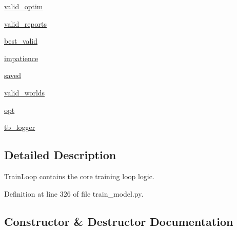 \begin{DoxyCompactItemize}
\hyperlink{classparlai_1_1scripts_1_1train__model_1_1TrainLoop_abe8e421aafd3a42103c794f3e3a1bcc6}{valid\+\_\+optim}
\item 
\hyperlink{classparlai_1_1scripts_1_1train__model_1_1TrainLoop_abceaa403716b5def408e2fedca6c651d}{valid\+\_\+reports}
\item 
\hyperlink{classparlai_1_1scripts_1_1train__model_1_1TrainLoop_a48a44b00d7b814ff20d0599803e92411}{best\+\_\+valid}
\item 
\hyperlink{classparlai_1_1scripts_1_1train__model_1_1TrainLoop_aeb16930507dc585a10096e2b235e2745}{impatience}
\item 
\hyperlink{classparlai_1_1scripts_1_1train__model_1_1TrainLoop_a22cd642f6665fabdc49cdd294e257643}{saved}
\item 
\hyperlink{classparlai_1_1scripts_1_1train__model_1_1TrainLoop_a45643d393057a2a47e8a6e74acdc7515}{valid\+\_\+worlds}
\item 
\hyperlink{classparlai_1_1scripts_1_1train__model_1_1TrainLoop_a3f9cd4c0c08f457b3ecfd1e494ccf58c}{opt}
\item 
\hyperlink{classparlai_1_1scripts_1_1train__model_1_1TrainLoop_af6636a1279a3fb33f57ba1af500d049b}{tb\+\_\+logger}
\end{DoxyCompactItemize}


\subsection{Detailed Description}
\begin{DoxyVerb}TrainLoop contains the core training loop logic.\end{DoxyVerb}
 

Definition at line 326 of file train\+\_\+model.\+py.



\subsection{Constructor \& Destructor Documentation}
\mbox{\label{classparlai_1_1scripts_1_1train__model_1_1TrainLoop_a87a9194a461efe30e8b4de6cd4036699}} 

